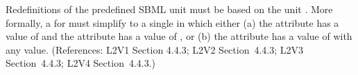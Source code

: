 Redefinitions of the predefined SBML unit  must be based on
the unit
.  More formally, a \UnitDefinition for  must
simplify to a single \Unit in which either (a) the 
attribute has a value of  and the 
attribute has a value of , or (b) the 
attribute has a value of  with any
 value.  (References: L2V1 Section 4.4.3; L2V2
Section~4.4.3; L2V3 Section~4.4.3; L2V4 Section~4.4.3.)
